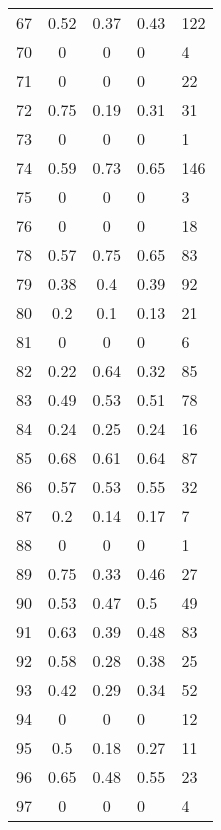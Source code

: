 \begin{longtable}[c]{|l|c|c|l|l|}
	67       & 0.52      & 0.37   & 0.43     & 122     \\
	70       & 0         & 0      & 0        & 4       \\
	71       & 0         & 0      & 0        & 22      \\
	72       & 0.75      & 0.19   & 0.31     & 31      \\
	73       & 0         & 0      & 0        & 1       \\
	74       & 0.59      & 0.73   & 0.65     & 146     \\
	75       & 0         & 0      & 0        & 3       \\
	76       & 0         & 0      & 0        & 18      \\
	78       & 0.57      & 0.75   & 0.65     & 83      \\
	79       & 0.38      & 0.4    & 0.39     & 92      \\
	80       & 0.2       & 0.1    & 0.13     & 21      \\
	81       & 0         & 0      & 0        & 6       \\
	82       & 0.22      & 0.64   & 0.32     & 85      \\
	83       & 0.49      & 0.53   & 0.51     & 78      \\
	84       & 0.24      & 0.25   & 0.24     & 16      \\
	85       & 0.68      & 0.61   & 0.64     & 87      \\
	86       & 0.57      & 0.53   & 0.55     & 32      \\
	87       & 0.2       & 0.14   & 0.17     & 7       \\
	88       & 0         & 0      & 0        & 1       \\
	89       & 0.75      & 0.33   & 0.46     & 27      \\
	90       & 0.53      & 0.47   & 0.5      & 49      \\
	91       & 0.63      & 0.39   & 0.48     & 83      \\
	92       & 0.58      & 0.28   & 0.38     & 25      \\
	93       & 0.42      & 0.29   & 0.34     & 52      \\
	94       & 0         & 0      & 0        & 12      \\
	95       & 0.5       & 0.18   & 0.27     & 11      \\
	96       & 0.65      & 0.48   & 0.55     & 23      \\
	97       & 0         & 0      & 0        & 4       \\

\end{longtable}
